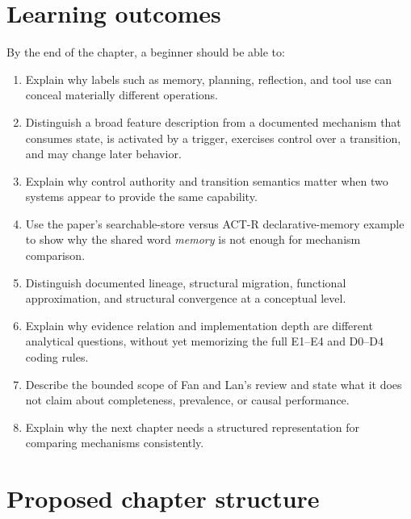 \section{Learning outcomes}
By the end of the chapter, a beginner should be able to:
\begin{enumerate}
  \item Explain why labels such as memory, planning, reflection, and tool use can conceal materially different operations.
  \item Distinguish a broad feature description from a documented mechanism that consumes state, is activated by a trigger, exercises control over a transition, and may change later behavior.
  \item Explain why control authority and transition semantics matter when two systems appear to provide the same capability.
  \item Use the paper's searchable-store versus ACT-R declarative-memory example to show why the shared word \emph{memory} is not enough for mechanism comparison.
  \item Distinguish documented lineage, structural migration, functional approximation, and structural convergence at a conceptual level.
  \item Explain why evidence relation and implementation depth are different analytical questions, without yet memorizing the full E1--E4 and D0--D4 coding rules.
  \item Describe the bounded scope of Fan and Lan's review and state what it does not claim about completeness, prevalence, or causal performance.
  \item Explain why the next chapter needs a structured representation for comparing mechanisms consistently.
\end{enumerate}

\section*{Proposed chapter structure}

